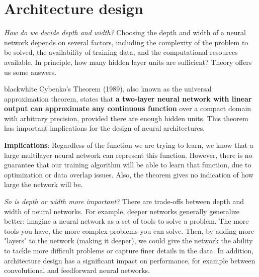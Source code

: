 \section{Architecture design}
\textit{How do we decide depth and width?} Choosing the depth and width of a neural network depends on several factors, including the complexity of the problem to be solved, the availability of training data, and the computational resources available. In principle, how many hidden layer units are sufficient? Theory offers us some answers.

\begin{remark}{black}{white}
Cybenko's Theorem (1989), also known as the universal approximation theorem, states that \textbf{a two-layer neural network with linear output can approximate any continuous function} over a compact domain with arbitrary precision, provided there are enough hidden units. This theorem has important implications for the design of neural architectures.
\end{remark}

\textbf{Implications}: Regardless of the function we are trying to learn, we know that a large multilayer neural network can represent this function. However, there is no guarantee that our training algorithm will be able to learn that function, due to optimization or data overlap issues. Also, the theorem gives no indication of how large the network will be.

\textit{So is depth or width more important?} There are trade-offs between depth and width of neural networks. For example, deeper networks generally generalize better: imagine a neural network as a set of tools to solve a problem. The more tools you have, the more complex problems you can solve. Then, by adding more "layers" to the network (making it deeper), we could give the network the ability to tackle more difficult problems or capture finer details in the data. In addition, architecture design has a significant impact on performance, for example between convolutional and feedforward neural networks.